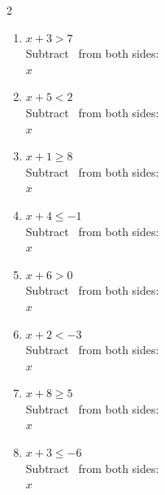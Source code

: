 \documentclass[12pt]{article}
\newcommand{\wsp}{\vspace{2.4cm}}
\newcommand{\sblank}{\underline{\hspace{1.4cm}}}
\begin{document}
\begin{multicols}{2}
\begin{enumerate}[label=\textbf{\arabic*.}, itemsep=0pt]

  \item $x + 3 > 7$\\[3pt]
  Subtract \sblank\ from both sides:\\[3pt]
  $x$ \underline{\hspace{0.4cm}} \sblank
  \wsp

  \item $x + 5 < 2$\\[3pt]
  Subtract \sblank\ from both sides:\\[3pt]
  $x$ \underline{\hspace{0.4cm}} \sblank
  \wsp

  \item $x + 1 \geq 8$\\[3pt]
  Subtract \sblank\ from both sides:\\[3pt]
  $x$ \underline{\hspace{0.4cm}} \sblank
  \wsp

  \item $x + 4 \leq -1$\\[3pt]
  Subtract \sblank\ from both sides:\\[3pt]
  $x$ \underline{\hspace{0.4cm}} \sblank
  \wsp

  \item $x + 6 > 0$\\[3pt]
  Subtract \sblank\ from both sides:\\[3pt]
  $x$ \underline{\hspace{0.4cm}} \sblank
  \wsp

  \item $x + 2 < -3$\\[3pt]
  Subtract \sblank\ from both sides:\\[3pt]
  $x$ \underline{\hspace{0.4cm}} \sblank
  \wsp

  \item $x + 8 \geq 5$\\[3pt]
  Subtract \sblank\ from both sides:\\[3pt]
  $x$ \underline{\hspace{0.4cm}} \sblank
  \wsp

  \item $x + 3 \leq -6$\\[3pt]
  Subtract \sblank\ from both sides:\\[3pt]
  $x$ \underline{\hspace{0.4cm}} \sblank
  \wsp

\end{enumerate}
\end{multicols}
\end{document}
